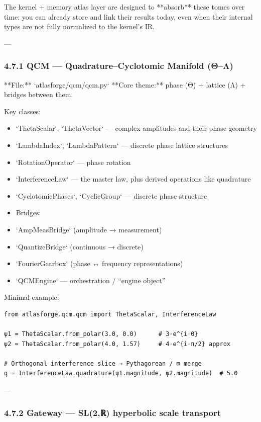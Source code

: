 \documentclass[11pt]{article}
\begin{document}
The kernel + memory atlas layer are designed to **absorb** these tomes over time: you can already store and link their results today, even when their internal types are not fully normalized to the kernel’s IR.

---

\subsubsection{4.7.1 QCM — Quadrature–Cyclotomic Manifold (Θ–Λ)}

**File:** `atlasforge/qcm/qcm.py`  
**Core theme:** phase (Θ) + lattice (Λ) + bridges between them.

Key classes:
\begin{itemize}
\item `ThetaScalar`, `ThetaVector` — complex amplitudes and their phase geometry
\item `LambdaIndex`, `LambdaPattern` — discrete phase lattice structures
\item `RotationOperator` — phase rotation
\item `InterferenceLaw` — the master law, plus derived operations like quadrature
\item `CyclotomicPhases`, `CyclicGroup` — discrete phase structure
\item Bridges:
\item `AmpMeasBridge` (amplitude → measurement)
\item `QuantizeBridge` (continuous → discrete)
\item `FourierGearbox` (phase ↔ frequency representations)
\item `QCMEngine` — orchestration / “engine object”
\end{itemize}

Minimal example:

\begin{lstlisting}
from atlasforge.qcm.qcm import ThetaScalar, InterferenceLaw

ψ1 = ThetaScalar.from_polar(3.0, 0.0)      # 3·e^{i·0}
ψ2 = ThetaScalar.from_polar(4.0, 1.57)     # 4·e^{i·π/2} approx

# Orthogonal interference slice → Pythagorean / ⊞ merge
q = InterferenceLaw.quadrature(ψ1.magnitude, ψ2.magnitude)  # 5.0
\end{lstlisting}

---

\subsubsection{4.7.2 Gateway — SL(2,ℝ) hyperbolic scale transport}
\end{document}
